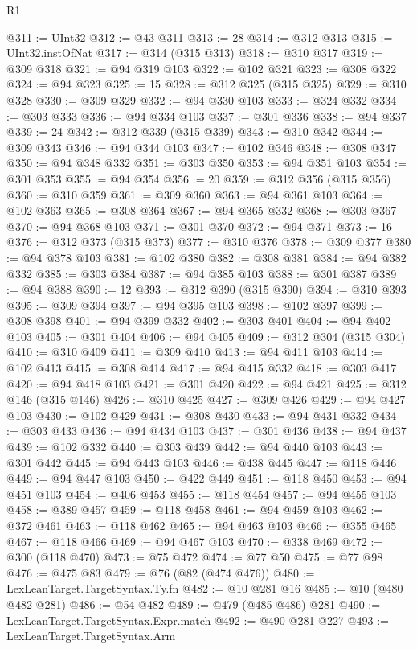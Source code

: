 \begin{lexlean}{R1}
\begin{coremodule}
@311 := UInt32
@312 := @43 @311
@313 := 28
@314 := @312 @313
@315 := UInt32.instOfNat
@317 := @314 (@315 @313)
@318 := @310 @317
@319 := @309 @318
@321 := @94 @319 @103
@322 := @102 @321
@323 := @308 @322
@324 := @94 @323
@325 := 15
@328 := @312 @325 (@315 @325)
@329 := @310 @328
@330 := @309 @329
@332 := @94 @330 @103
@333 := @324 @332
@334 := @303 @333
@336 := @94 @334 @103
@337 := @301 @336
@338 := @94 @337
@339 := 24
@342 := @312 @339 (@315 @339)
@343 := @310 @342
@344 := @309 @343
@346 := @94 @344 @103
@347 := @102 @346
@348 := @308 @347
@350 := @94 @348 @332
@351 := @303 @350
@353 := @94 @351 @103
@354 := @301 @353
@355 := @94 @354
@356 := 20
@359 := @312 @356 (@315 @356)
@360 := @310 @359
@361 := @309 @360
@363 := @94 @361 @103
@364 := @102 @363
@365 := @308 @364
@367 := @94 @365 @332
@368 := @303 @367
@370 := @94 @368 @103
@371 := @301 @370
@372 := @94 @371
@373 := 16
@376 := @312 @373 (@315 @373)
@377 := @310 @376
@378 := @309 @377
@380 := @94 @378 @103
@381 := @102 @380
@382 := @308 @381
@384 := @94 @382 @332
@385 := @303 @384
@387 := @94 @385 @103
@388 := @301 @387
@389 := @94 @388
@390 := 12
@393 := @312 @390 (@315 @390)
@394 := @310 @393
@395 := @309 @394
@397 := @94 @395 @103
@398 := @102 @397
@399 := @308 @398
@401 := @94 @399 @332
@402 := @303 @401
@404 := @94 @402 @103
@405 := @301 @404
@406 := @94 @405
@409 := @312 @304 (@315 @304)
@410 := @310 @409
@411 := @309 @410
@413 := @94 @411 @103
@414 := @102 @413
@415 := @308 @414
@417 := @94 @415 @332
@418 := @303 @417
@420 := @94 @418 @103
@421 := @301 @420
@422 := @94 @421
@425 := @312 @146 (@315 @146)
@426 := @310 @425
@427 := @309 @426
@429 := @94 @427 @103
@430 := @102 @429
@431 := @308 @430
@433 := @94 @431 @332
@434 := @303 @433
@436 := @94 @434 @103
@437 := @301 @436
@438 := @94 @437
@439 := @102 @332
@440 := @303 @439
@442 := @94 @440 @103
@443 := @301 @442
@445 := @94 @443 @103
@446 := @438 @445
@447 := @118 @446
@449 := @94 @447 @103
@450 := @422 @449
@451 := @118 @450
@453 := @94 @451 @103
@454 := @406 @453
@455 := @118 @454
@457 := @94 @455 @103
@458 := @389 @457
@459 := @118 @458
@461 := @94 @459 @103
@462 := @372 @461
@463 := @118 @462
@465 := @94 @463 @103
@466 := @355 @465
@467 := @118 @466
@469 := @94 @467 @103
@470 := @338 @469
@472 := @300 (@118 @470)
@473 := @75 @472
@474 := @77 @50
@475 := @77 @98
@476 := @475 @83
@479 := @76 (@82 (@474 @476))
@480 := LexLeanTarget.TargetSyntax.Ty.fn
@482 := @10 @281 @16
@485 := @10 (@480 @482 @281)
@486 := @54 @482
@489 := @479 (@485 @486) @281
@490 := LexLeanTarget.TargetSyntax.Expr.match
@492 := @490 @281 @227
@493 := LexLeanTarget.TargetSyntax.Arm

\end{coremodule}
\end{lexlean}
